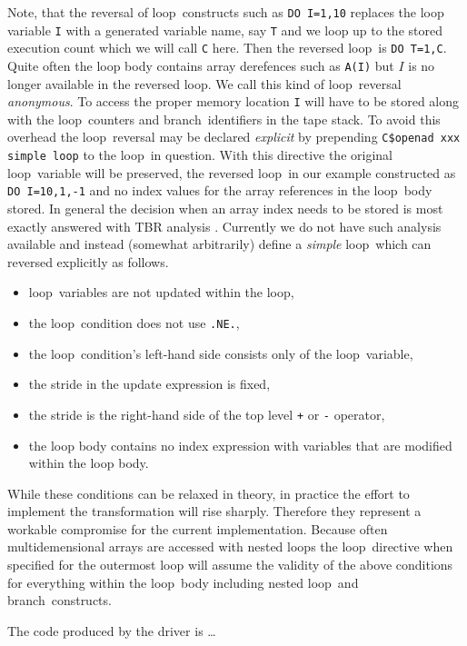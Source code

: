 \documentclass[11pt]{article}
\newcommand{\Loop}{loop}
\newcommand{\branch}{branch}
\newcommand{\code}[1]{{\small\tt{#1}}}
\begin{document}
Note, that the reversal of  \Loop\ constructs such as \code{DO I=1,10} replaces 
the loop variable \code{I} with a generated variable name, say \code{T} and we 
loop up to  the stored execution count which we will call  \code{C} here. 
Then the reversed \Loop\ is \code{DO T=1,C}. Quite often the loop body contains 
array derefences such as \code{A(I)} but ${I}$ is no longer available in the 
reversed \Loop. We call this kind of \Loop\ reversal {\em anonymous}. 
To access the proper memory location \code{I} will have to be stored along with the 
\Loop\ counters and \branch\ identifiers in the tape stack.
To avoid this overhead the \Loop\ reversal may be declared {\em explicit}
by prepending \code{C\$openad xxx simple loop} to the \Loop\ in question. 
With this directive the original \Loop\ variable will be preserved,  
the reversed \Loop\ in our example constructed as \code{DO I=10,1,-1} and 
no index values for the array references in the \Loop\ body stored. 
In general the decision when an array index needs to be stored is most  exactly answered 
with TBR analysis \cite{HNP02}. 
Currently we do not have such  analysis available and instead 
(somewhat arbitrarily) define a {\em simple}
\Loop\ which can reversed explicitly as follows. 
\begin{itemize}
\item \Loop\ variables are not updated within the loop,
\item the \Loop\ condition does not use \code{.NE.},
\item the \Loop\ condition's left-hand side consists only of the \Loop\ variable,
\item the stride in the update expression is fixed,
\item the stride is the right-hand side of the top level \code{+} or \code{-} operator,
\item the loop body contains no index expression with variables that are modified within the loop body.
\end{itemize}
While these conditions can be relaxed in theory, in practice the effort to implement 
the transformation will rise sharply. Therefore they represent a workable compromise 
for the current implementation. 
Because often multidemensional arrays  are accessed with nested loops the 
\Loop\ directive when specified for the outermost loop will assume the validity 
of the above conditions for everything within the \Loop\ body including nested 
\Loop\ and \branch\ constructs. 

{\color{red} The code produced by the driver is \ldots} 
\end{document}
